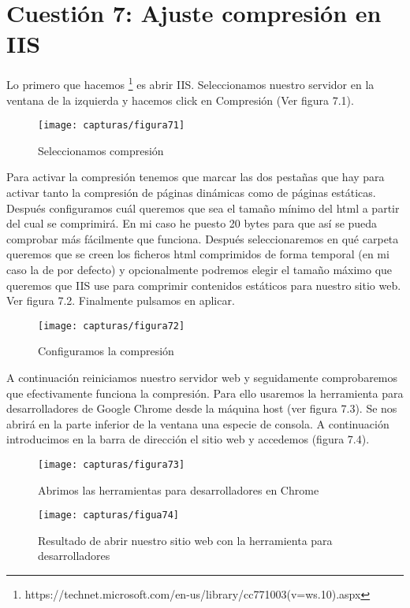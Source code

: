	\section{Cuestión 7: Ajuste compresión en IIS}
	Lo primero que hacemos \footnote{https://technet.microsoft.com/en-us/library/cc771003(v=ws.10).aspx} es abrir IIS. Seleccionamos nuestro servidor en la ventana de la izquierda y hacemos click en Compresión (Ver figura 7.1).
	\begin{figure} [H]
	\centering
	\texttt{[image: capturas/figura71]}
	\caption{Seleccionamos compresión}
	\label{fig:figura71}
	\end{figure}


Para activar la compresión tenemos que marcar las dos pestañas que hay para activar tanto la compresión de páginas dinámicas como de páginas estáticas. Después configuramos cuál queremos que sea el tamaño mínimo del html a partir del cual se comprimirá. En mi caso he puesto 20 bytes para que así se pueda comprobar más fácilmente que funciona. Después seleccionaremos en qué carpeta queremos que se creen los ficheros html comprimidos de forma temporal (en mi caso la de por defecto) y opcionalmente podremos elegir el tamaño máximo que queremos que IIS use para comprimir contenidos estáticos para nuestro sitio web. Ver figura 7.2. Finalmente pulsamos en aplicar.
	\begin{figure} [H]
	\centering
	\texttt{[image: capturas/figura72]}
	\caption{Configuramos la compresión}
	\label{fig:figura72}
	\end{figure}
A continuación reiniciamos nuestro servidor web y seguidamente comprobaremos que efectivamente funciona la compresión. Para ello usaremos la herramienta para desarrolladores de Google Chrome desde la máquina host (ver figura 7.3).
Se nos abrirá en la parte inferior de la ventana una especie de consola. A continuación introducimos en la barra de dirección el sitio web y accedemos (figura 7.4).
	\begin{figure} [H]
	\centering
	\texttt{[image: capturas/figura73]}
	\caption{Abrimos las herramientas para desarrolladores en Chrome}
	\label{fig:figura73}
	\end{figure}
	
	\begin{figure} [H]
	\centering
	\texttt{[image: capturas/figua74]}
	\caption{Resultado de abrir nuestro sitio web con la herramienta para desarrolladores}
	\label{fig:figura74}
	\end{figure}

